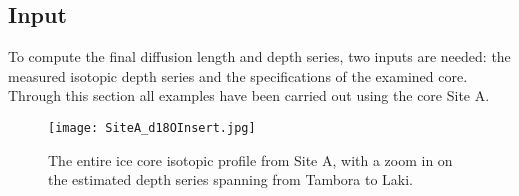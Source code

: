 \documentclass[../../CompleteThesis/Complete_1stDraft.tex]{subfiles}
\begin{document}
	
	
	
	
	\subsection[Input]{Input}
	\label{Subsec:Method_FirstSigmaEstimate_Input}
	To compute the final diffusion length and depth series, two inputs are needed: the measured isotopic depth series and the specifications of the examined core. Through this section all examples have been carried out using the core Site A.\\
	\begin{figure}
		\centering
		\texttt{[image: SiteA\_d18OInsert.jpg]}
		\caption[Full $\delta^{18}$O record with insert, Site A]{The entire ice core isotopic profile from Site A, with a zoom in on the estimated depth series spanning from Tambora to Laki.}
		\label{fig:SiteA_d18OInsert}
	\end{figure}
	
\end{document}
